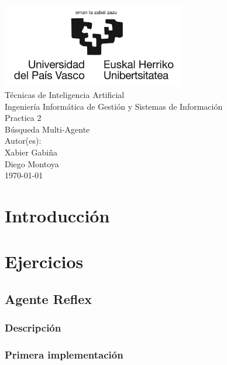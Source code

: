 \documentclass{report}
\begin{document}
    \begin{titlepage}
        \centering
        \includegraphics[width=0.6\textwidth]{./.img/logo.jpg}\\
        \vspace{1cm}
        \LARGE Técnicas de Inteligencia Artificial\\
        \vspace{0.5cm}
        \Large Ingeniería Informática de Gestión y Sistemas de Información\\
        \vspace{3cm}
        \Huge Practica 2\\
        \huge Búsqueda Multi-Agente\\
        \vspace{2.5cm}
        \Large Autor(es):\\
        \vspace{0.2cm}
        \large Xabier Gabiña\\
        \large Diego Montoya\\
        \vfill
        \today
    \end{titlepage}
    \tableofcontents
    \listoffigures
    \lstlistoflistings
    \chapter{Introducción}
    \chapter{Ejercicios}
      \section{Agente Reflex}
        \subsection{Descripción}
        \subsection{Primera implementación}
          \begin{lstlisting}[language=Python, caption=Implementación inicial del agente reflex]
          \end{lstlisting}
\end{document}
